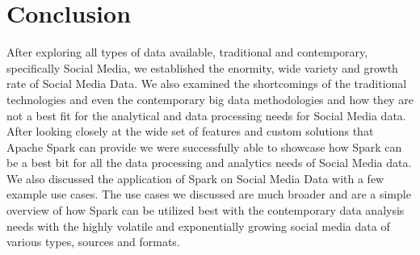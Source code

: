 \documentclass[sigconf]{acmart}
\begin{document}
\section{Conclusion}
After exploring all types of data available, traditional and contemporary, specifically Social Media, we established the enormity, wide variety and growth rate of Social Media Data. We also examined the shortcomings of the traditional technologies and even the contemporary big data methodologies and how they are not a best fit for the analytical and data processing needs for Social Media data. After looking closely at the wide set of features and custom solutions that Apache Spark can provide we were successfully able to showcase how Spark can be a best bit for all the data processing and analytics needs of Social Media data. We also discussed the application of Spark on Social Media Data with a few example use cases. The use cases we discussed are much broader and are a simple overview of how Spark can be utilized best with the contemporary data analysis needs with the highly volatile and exponentially growing social media data of various types, sources and formats.


 
\end{document}
